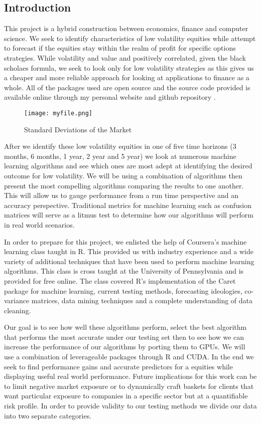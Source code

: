 \documentclass[paper=letter, fontsize=11pt]{scrartcl}
\numberwithin{equation}{section}		%
\numberwithin{figure}{section}			%
\numberwithin{table}{section}				%
\begin{document}
\begin{spacing}{2}
\section{Introduction}
This project is a hybrid construction between economics, finance and computer science. We seek to identify characteristics of low volatility equities while attempt to forecast if the equities stay within the realm of profit for specific options strategies. While volatility and value and positively correlated, given the black scholaes formula, we seek to look only for low volatility strategies as this gives us a cheaper and more reliable approach for looking at applications to finance as a whole. All of the packages used are open source and the source code provided is available online through my personal website and github repository\cite{gilyard_website} \cite{github_repo}. 

\begin{figure}[Charting]
\centering
\texttt{[image: myfile.png]}
\caption{Standard Deviations of the Market}
\end{figure}
After we identify these low volatility equities in one of five time horizons (3 months, 6 months, 1 year, 2 year and 5 year) we look at numerous machine learning algorithms and see which ones are most adept at identifying the desired outcome for low volatility. We will be using a combination of algorithms then present the most compelling algorithms comparing the results to one another. This will allow us to gauge performance from a run time perspective and an accuracy perspective. Traditional metrics for machine learning such as confusion matrices will serve as a litmus test to determine how our algorithms will perform in real world scenarios. 

In order to prepare for this project, we enlisted the help of Coursera's machine learning class taught in R. This provided us with industry experience and a wide variety of additional techniques that have been used to perform machine learning algorithms. This class is cross taught at the University of Pennsylvania and is provided for free online. The class covered R's implementation of the Caret package for machine learning, current testing methods, forecasting ideologies, co-variance matrices, data mining techniques and a complete understanding of data cleaning. 

Our goal is to see how well these algorithms perform, select the best algorithm that performs the most accurate under our testing set then to see how we can increase the performance of our algorithms by porting them to GPUs. We will use a combination of leverageable packages through R and CUDA. In the end we seek to find performance gains and accurate predictors for a equities while displaying useful real world performance. Future implications for this work can be to limit negative market exposure or to dynamically craft baskets for clients that want particular exposure to companies in a specific sector but at a quantifiable risk profile. In order to provide validity to our testing methods we divide our data into two separate categories. 

\end{spacing}
\end{document}

